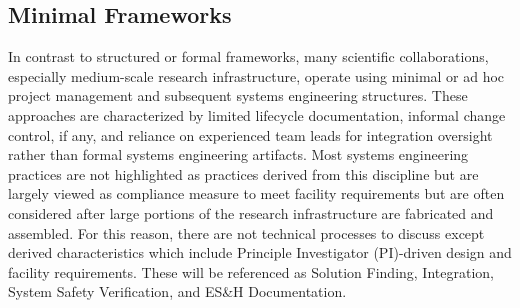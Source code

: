 \subsection{Minimal Frameworks}
\label{sub:minimal}
In contrast to structured or formal frameworks, many scientific collaborations, especially medium-scale research infrastructure, operate using minimal or ad hoc project management and subsequent systems engineering structures.
These approaches are characterized by limited lifecycle documentation, informal change control, if any, and reliance on experienced team leads for integration oversight rather than formal systems engineering artifacts. 
Most systems engineering practices are not highlighted as practices derived from this discipline but are largely viewed as compliance measure to meet facility requirements but are often considered after large portions of the research infrastructure are fabricated and assembled.
For this reason, there are not technical processes to discuss except derived characteristics which include Principle Investigator (PI)-driven design and facility requirements.
These will be referenced as Solution Finding, Integration, System Safety Verification, and ES\&H Documentation.
